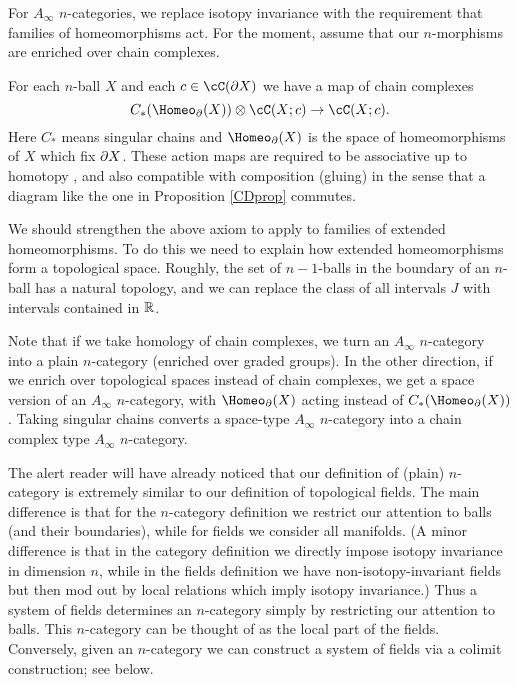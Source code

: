 
\smallskip

For $A_\infty$ $n$-categories, we replace
isotopy invariance with the requirement that families of homeomorphisms act.
For the moment, assume that our $n$-morphisms are enriched over chain complexes.

\begin{axiom}
For each $n$-ball $X$ and each $c\in \cC(\bd X)$ we have a map of chain complexes
\[
	C_*(\Homeo_\bd(X))\ot \cC(X; c) \to \cC(X; c) .
\]
Here $C_*$ means singular chains and $\Homeo_\bd(X)$ is the space of homeomorphisms of $X$
which fix $\partial X$.
These action maps are required to be associative up to homotopy
, and also compatible with composition (gluing) in the sense that
a diagram like the one in Proposition \ref{CDprop} commutes.
\end{axiom}

We should strengthen the above axiom to apply to families of extended homeomorphisms.
To do this we need to explain how extended homeomorphisms form a topological space.
Roughly, the set of $n{-}1$-balls in the boundary of an $n$-ball has a natural topology,
and we can replace the class of all intervals $J$ with intervals contained in $\mathbb{R}$.

Note that if we take homology of chain complexes, we turn an $A_\infty$ $n$-category
into a plain $n$-category (enriched over graded groups).
In the other direction, if we enrich over topological spaces instead of chain complexes,
we get a space version of an $A_\infty$ $n$-category, with $\Homeo_\bd(X)$ acting 
instead of  $C_*(\Homeo_\bd(X))$.
Taking singular chains converts a space-type $A_\infty$ $n$-category into a chain complex
type $A_\infty$ $n$-category.

\medskip

The alert reader will have already noticed that our definition of (plain) $n$-category
is extremely similar to our definition of topological fields.
The main difference is that for the $n$-category definition we restrict our attention to balls
(and their boundaries), while for fields we consider all manifolds.
(A minor difference is that in the category definition we directly impose isotopy
invariance in dimension $n$, while in the fields definition we have non-isotopy-invariant fields
but then mod out by local relations which imply isotopy invariance.)
Thus a system of fields determines an $n$-category simply by restricting our attention to
balls.
This $n$-category can be thought of as the local part of the fields.
Conversely, given an $n$-category we can construct a system of fields via 
a colimit construction; see below.

